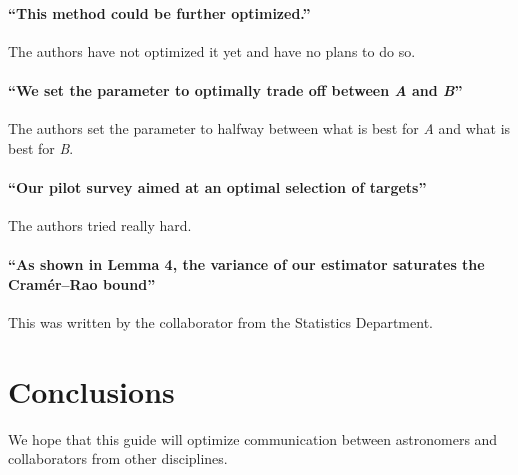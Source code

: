 \documentclass[12pt, preprint]{aastex}
\begin{document}

\paragraph{``This method could be further optimized.''}
The authors have not optimized it yet and have no plans to do so.

\paragraph{``We set the parameter to optimally trade off between \emph{A} and \emph{B}''}
The authors set the parameter to halfway between what is best for
\emph{A} and what is best for \emph{B}.

\paragraph{``Our pilot survey aimed at an optimal selection of targets''}
The authors tried really hard.

\paragraph{``As shown in Lemma 4, the variance of our estimator saturates
the Cram\'er--Rao bound''}
This was written by the collaborator from the Statistics Department.


\section{Conclusions}

We hope that this guide will optimize communication between astronomers
and collaborators from other disciplines.
\end{document}
